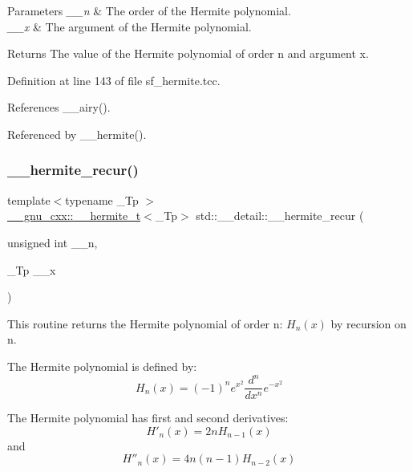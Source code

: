 \begin{DoxyParams}{Parameters}
{\em \+\_\+\+\_\+n} & The order of the Hermite polynomial. \\
\hline
{\em \+\_\+\+\_\+x} & The argument of the Hermite polynomial. \\
\hline
\end{DoxyParams}
\begin{DoxyReturn}{Returns}
The value of the Hermite polynomial of order n and argument x. 
\end{DoxyReturn}


Definition at line 143 of file sf\+\_\+hermite.\+tcc.



References \+\_\+\+\_\+airy().



Referenced by \+\_\+\+\_\+hermite().

\mbox{\label{namespacestd_1_1____detail_addad9d3f5ca8a7ddae63c9e7c5374e70}} 
\subsubsection{\texorpdfstring{\+\_\+\+\_\+hermite\+\_\+recur()}{\_\_hermite\_recur()}}
{\footnotesize\ttfamily template$<$typename \+\_\+\+Tp $>$ \\
\hyperlink{struct____gnu__cxx_1_1____hermite__t}{\+\_\+\+\_\+gnu\+\_\+cxx\+::\+\_\+\+\_\+hermite\+\_\+t}$<$\+\_\+\+Tp$>$ std\+::\+\_\+\+\_\+detail\+::\+\_\+\+\_\+hermite\+\_\+recur (\begin{DoxyParamCaption}\item[{unsigned int}]{\+\_\+\+\_\+n,  }\item[{\+\_\+\+Tp}]{\+\_\+\+\_\+x }\end{DoxyParamCaption})}



This routine returns the Hermite polynomial of order n\+: $ H_n(x) $ by recursion on n. 

The Hermite polynomial is defined by\+: \[ H_n(x) = (-1)^n e^{x^2} \frac{d^n}{dx^n} e^{-x^2} \]

The Hermite polynomial has first and second derivatives\+: \[ H'_n(x) = 2n H_{n-1}(x) \] and \[ H''_n(x) = 4n(n - 1) H_{n-2}(x) \]

